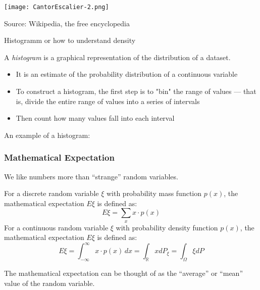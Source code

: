 \documentclass[fullscreen=true, bookmarks=true, hyperref={pdfencoding=unicode}]{beamer}
\begin{document}
\begin{frame}
  \centering
  \texttt{[image: CantorEscalier-2.png]}

  {\footnotesize Source: Wikipedia, the free encyclopedia}
\end{frame}


\begin{frame}{Histogramm or how to understand density}
  
  A \textit{histogram} is a graphical representation of the distribution of a dataset. 

  \begin{itemize}
      \pause\item It is an estimate of the probability distribution of a 
      continuous variable
      \pause\item To construct a histogram, the first step is to "bin" 
      the range of values — that is, divide the entire range of values into 
      a series of intervals
      \pause\item Then count how many values fall into each interval
  \end{itemize}
      
\end{frame}


\begin{frame}
  An example of a histogram:
  
  \begin{center}
  \end{center}
\end{frame}


\begin{frame}
  \frametitle{Mathematical Expectation}

  We like numbers more than ``strange'' random variables.
  
  \pause
  \begin{definition}
  For a discrete random variable $\xi$ with probability mass function $p(x)$, 
  the mathematical expectation $E\xi$ is defined as:
  \[
  E\xi = \sum_{x} x \cdot p(x)
  \]
  For a continuous random variable $\xi$ with probability density function $p(x)$, 
  the mathematical expectation $E\xi$ is defined as:
  \[
  E\xi = \int_{-\infty}^{\infty} x \cdot p(x) \, dx = 
  \int_{\mathbb{R}} x d P_\xi = \int_{\Omega} \xi d P
  \]
  \end{definition}
  
  \pause
  {\small The mathematical expectation can be thought of 
  as the ``average'' or ``mean'' value of the random variable.}
  
\end{frame}
\end{document}
